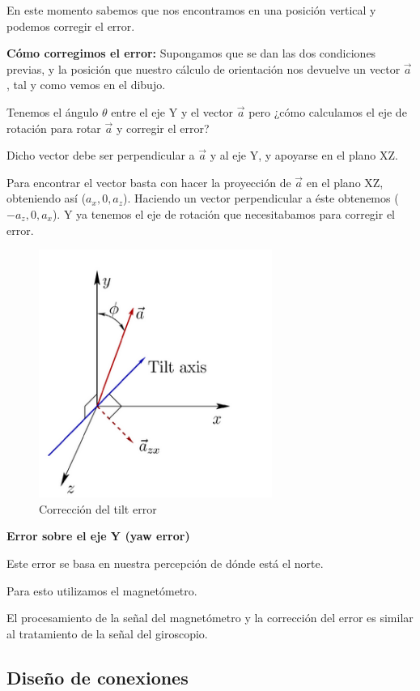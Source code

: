 \documentclass[twoside, 12pt]{epstfg}
\begin{document}
En este momento sabemos que nos encontramos en una posición vertical y podemos corregir el error.

\textbf{Cómo corregimos el error:}
Supongamos que se dan las dos condiciones previas, y la posición que nuestro cálculo de orientación nos devuelve un vector $\vec{a}$, tal y como vemos en el dibujo.

Tenemos el ángulo $\theta$ entre el eje Y y el vector $\vec{a}$ pero ¿cómo calculamos el eje de rotación para rotar $\vec{a}$ y corregir el error?

Dicho vector debe ser perpendicular a $\vec{a}$ y al eje Y, y apoyarse en el plano XZ.

Para encontrar el vector basta con hacer la proyección de $\vec{a}$ en el plano XZ, obteniendo así ($a_x, 0 , a_z$). Haciendo un vector perpendicular a éste obtenemos ($-a_z, 0 , a_x$). Y ya tenemos el eje de rotación que necesitabamos para corregir el error.

\begin{figure}[h]
	\centerline{
		\mbox{\includegraphics[width=3.00in]{images/ejestracking.png}}
	}
	\caption{Corrección del tilt error}
\end{figure}


\newpage
\textbf{Error sobre el eje Y (yaw error)}

Este error se basa en nuestra percepción de dónde está el norte.

Para esto utilizamos el magnetómetro.

El procesamiento de la señal del magnetómetro y la corrección del error es similar al tratamiento de la señal del giroscopio.

\subsection{Diseño de conexiones}
\end{document}
